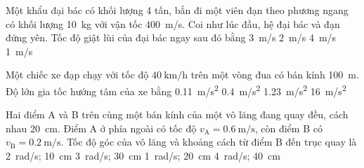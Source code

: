 \begin{ex}
	Một khẩu đại bác có khối lượng 4 tấn, bắn đi một viên đạn theo phương ngang có khối lượng \SI{10}{\kilogram} với vận tốc \SI{400}{\meter/\second}. Coi như lúc đầu, hệ đại bác và đạn đứng yên. Tốc độ giật lùi của đại bác ngay sau đó bằng
	\choice
	{\SI{3}{\meter/\second}}
	{\SI{2}{\meter/\second}}
	{\SI{4}{\meter/\second}}
	{\True \SI{1}{\meter/\second}}
	\loigiai{}
\end{ex}
\begin{ex}
	Một chiếc xe đạp chạy với tốc độ $\SI{40}{\kilo\meter/\hour}$ trên một vòng đua có bán kính \SI{100}{\meter}. Độ lớn gia tốc hướng tâm của xe bằng
	\choice
	{\SI{0.11}{\meter/\second^2}}
	{\SI{0.4}{\meter/\second^2}}
	{\True \SI{1.23}{\meter/\second^2}}
	{\SI{16}{\meter/\second^2}}
	\loigiai{}
\end{ex}
\begin{ex}
	Hai điểm A và B trên cùng một bán kính của một vô lăng đang quay đều, cách nhau \SI{20}{\centi\meter}. Điểm A ở phía ngoài có tốc độ $v_{\mathrm{A}}=\SI{0.6}{\meter/\second}$, còn điểm B có $v_{\mathrm{B}}=\SI{0.2}{\meter/\second}$. Tốc độ góc của vô lăng và khoảng cách từ điểm B đến trục quay là
	\choice
	{\True \SI{2}{\radian/\second}; \SI{10}{\centi\meter}}
	{\SI{3}{\radian/\second}; \SI{30}{\centi\meter}}
	{\SI{1}{\radian/\second}; \SI{20}{\centi\meter}}
	{\SI{4}{\radian/\second}; \SI{40}{\centi\meter}}
	\loigiai{}
\end{ex}
